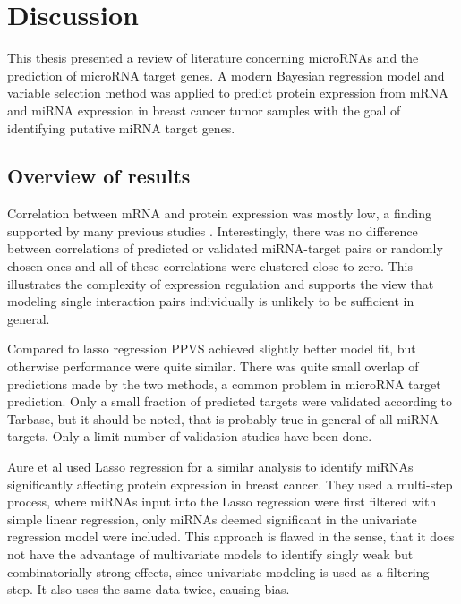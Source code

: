 
\section{Discussion}

This thesis presented a review of literature concerning microRNAs and the
prediction of microRNA target genes. A modern Bayesian regression model and
variable selection method was applied to predict protein expression from mRNA
and miRNA expression in breast cancer tumor samples with the goal of
identifying putative miRNA target genes.

\subsection*{Overview of results}

Correlation between mRNA and protein expression was mostly low, a finding
supported by many previous studies \citep{Payne2015}. Interestingly, there was
no difference between correlations of predicted or validated miRNA-target
pairs or randomly chosen ones and all of these correlations were clustered
close to zero. This illustrates the complexity of expression regulation and
supports the view that modeling single interaction pairs individually is
unlikely to be sufficient in general.

Compared to lasso regression PPVS achieved slightly better model fit, but
otherwise performance were quite similar. There was quite small overlap of
predictions made by the two methods, a common problem in microRNA target
prediction. Only a small fraction of predicted targets were validated
according to Tarbase, but it should be noted, that is probably true in general
of all miRNA targets. Only a limit number of validation studies have been
done.

Aure et al used Lasso regression for a similar analysis
to identify miRNAs significantly
affecting protein expression in breast cancer. They used a multi-step
process, where miRNAs input into the Lasso regression were first
filtered with simple linear regression, only miRNAs deemed significant
in the univariate regression model were included. This approach is
flawed in the sense, that it does not have the advantage of multivariate
models to identify singly weak but combinatorially strong effects, since univariate
modeling is used as a filtering step. It also uses the same data twice,
causing bias.

